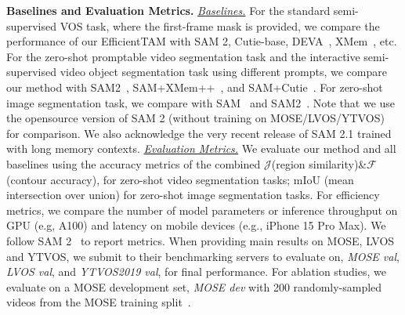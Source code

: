 \noindent\textbf{Baselines and Evaluation Metrics.}
\underline{\textit{Baselines.}} For the standard semi-supervised VOS task, where the first-frame mask is provided, we compare the performance of our EfficientTAM with SAM 2\citep{ravi2024sam}, Cutie-base\citep{cheng2024putting}, DEVA~\citep{cheng2023tracking}, XMem~\citep{cheng2022xmem}, etc.
For the zero-shot promptable video segmentation task and the interactive semi-supervised video object segmentation task using different prompts, we compare our method with SAM2~\citep{ravi2024sam}, SAM+XMem++~\citep{ravi2024sam}, and SAM+Cutie~\citep{ravi2024sam}. For zero-shot image segmentation task, we compare with SAM~\citep{kirillov2023segment} and SAM2~\citep{ravi2024sam}. Note that we use the opensource version of SAM 2 (without training on MOSE/LVOS/YTVOS) for comparison. We also acknowledge the very recent release of SAM 2.1 trained with long memory contexts. 
\underline{\textit{Evaluation Metrics.}} We evaluate our method and all baselines using the accuracy metrics of the combined $\mathcal{J}$(region similarity)\&$\mathcal{F}$(contour accuracy),  for zero-shot video segmentation tasks; mIoU (mean intersection over union) for zero-shot image segmentation tasks. For efficiency metrics, we compare the number of model parameters or inference throughput on GPU (e.g, A100) and latency on mobile devices (e.g., iPhone 15 Pro Max). We follow SAM 2~\citep{ravi2024sam} to report metrics. When providing main results on MOSE, LVOS and YTVOS, we submit to their benchmarking servers to evaluate on, \textit{MOSE val}, \textit{LVOS val}, and \textit{YTVOS2019 val}, for final performance. For ablation studies, we evaluate on a MOSE development set, \textit{MOSE dev} with 200 randomly-sampled videos from the MOSE training split~\citep{ravi2024sam}.

